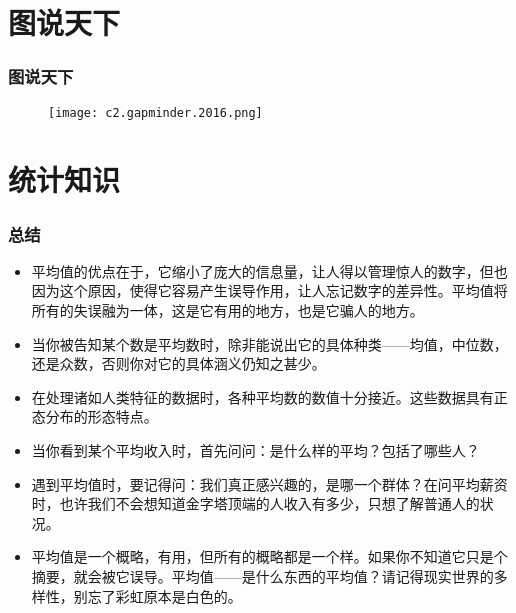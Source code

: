 \section{图说天下}
\begin{frame}
  \frametitle{图说天下}
  \begin{figure}
    \centering
    \texttt{[image: c2.gapminder.2016.png]}
  \end{figure}
\end{frame}

\section{统计知识}
\begin{frame}
  \frametitle{总结}
  \begin{itemize}
    \item 平均值的优点在于，它缩小了庞大的信息量，让人得以管理惊人的数字，但也因为这个原因，使得它容易产生误导作用，让人忘记数字的差异性。平均值将所有的失误融为一体，这是它有用的地方，也是它骗人的地方。
    \item 当你被告知某个数是平均数时，除非能说出它的具体种类——均值，中位数，还是众数，否则你对它的具体涵义仍知之甚少。
    \item 在处理诸如人类特征的数据时，各种平均数的数值十分接近。这些数据具有正态分布的形态特点。
    \item 当你看到某个平均收入时，首先问问：是什么样的平均？包括了哪些人？
    \item 遇到平均值时，要记得问：我们真正感兴趣的，是哪一个群体？在问平均薪资时，也许我们不会想知道金字塔顶端的人收入有多少，只想了解普通人的状况。
    \item 平均值是一个概略，有用，但所有的概略都是一个样。如果你不知道它只是个摘要，就会被它误导。平均值——是什么东西的平均值？请记得现实世界的多样性，别忘了彩虹原本是白色的。
  \end{itemize}
\end{frame}


